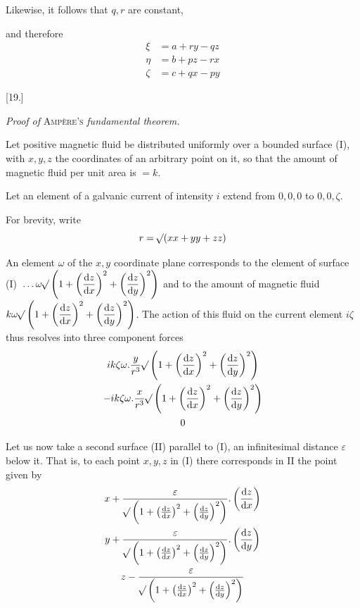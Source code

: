 Likewise, it follows that $q,r$ are constant,

and therefore
\[
\begin{aligned}
\xi&=a+ry-qz\\
\eta&=b+pz-rx\\
\zeta&=c+qx-py
\end{aligned}
\]

\begin{center}[19.]\par\medskip\textit{Proof of} \textsc{Ampère’s} \textit{fundamental theorem.}\end{center}
Let positive magnetic fluid be distributed uniformly over a bounded surface (I), with $x,y,z$ the coordinates of an arbitrary point on it, so that the amount of magnetic fluid per unit area is $=k$.

Let an element of a galvanic current of intensity $i$ extend from $0,0,0$ to $0,0,\zeta$.

For brevity, write
\[
r=\mathord{{}^{}\!\surd}(xx+yy+zz)
\]

An element $\omega$ of the $x,y$ coordinate plane corresponds to the element of surface (I) $\, .\, .\, .\,\omega\mathord{{}^{}\!\surd}\left(1+\left(\dfrac{\mathrm dz}{\mathrm dx}\right)^2+\left(\dfrac{\mathrm dz}{\mathrm dy}\right)^2\right)$ and to the amount of magnetic fluid $k\omega\mathord{{}^{}\!\surd}\left(1+\left(\dfrac{\mathrm dz}{\mathrm dx}\right)^2+\left(\dfrac{\mathrm dz}{\mathrm dy}\right)^2\right)$. The action of this fluid on the current element $i\zeta$ thus resolves into three component forces
\[
\begin{gathered}
ik\zeta\omega.\frac{y}{r^3}\mathord{{}^{}\!\surd}\left(1+\left(\frac{\mathrm dz}{\mathrm dx}\right)^2+\left(\frac{\mathrm dz}{\mathrm dy}\right)^2\right)\\
-ik\zeta\omega.\frac{x}{r^3}\mathord{{}^{}\!\surd}\left(1+\left(\frac{\mathrm dz}{\mathrm dx}\right)^2+\left(\frac{\mathrm dz}{\mathrm dy}\right)^2\right)\\
0
\end{gathered}
\]

Let us now take a second surface (II) parallel to (I), an infinitesimal distance $\varepsilon$ below it. That is, to each point $x,y,z$ in (I) there corresponds in II the point given by
\[
\begin{gathered}
x+\frac{\varepsilon}{\mathord{{}^{}\!\surd}\left(1+\left(\frac{\mathrm dz}{\mathrm dx}\right)^2+\left(\frac{\mathrm dz}{\mathrm dy}\right)^2\right)}.\left(\frac{\mathrm dz}{\mathrm dx}\right)\\
y+\frac{\varepsilon}{\mathord{{}^{}\!\surd}\left(1+\left(\frac{\mathrm dz}{\mathrm dx}\right)^2+\left(\frac{\mathrm dz}{\mathrm dy}\right)^2\right)}.\left(\frac{\mathrm dz}{\mathrm dy}\right)\\
z-\frac{\varepsilon}{\mathord{{}^{}\!\surd}\left(1+\left(\frac{\mathrm dz}{\mathrm dx}\right)^2+\left(\frac{\mathrm dz}{\mathrm dy}\right)^2\right)}
\end{gathered}
\]


